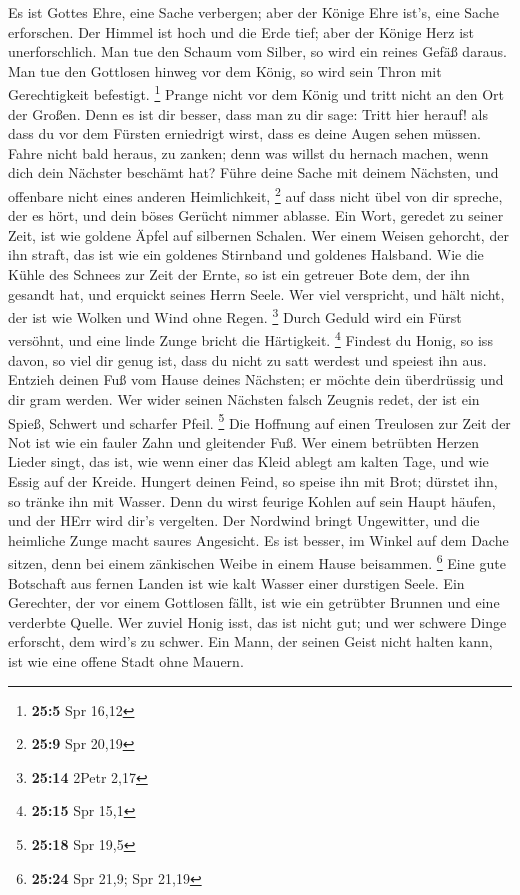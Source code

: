  Es ist Gottes Ehre, eine Sache verbergen; aber der Könige
Ehre ist's, eine Sache erforschen.  Der Himmel ist hoch
und die Erde tief; aber der Könige Herz ist unerforschlich.
 Man tue den Schaum vom Silber, so wird ein reines Gefäß
daraus.  Man tue den Gottlosen hinweg vor dem König, so
wird sein Thron mit Gerechtigkeit befestigt. \footnote{\textbf{25:5} Spr
  16,12}  Prange nicht vor dem König und tritt nicht an
den Ort der Großen.  Denn es ist dir besser, dass man zu
dir sage: Tritt hier herauf! als dass du vor dem Fürsten erniedrigt
wirst, dass es deine Augen sehen müssen.  Fahre nicht bald
heraus, zu zanken; denn was willst du hernach machen, wenn dich dein
Nächster beschämt hat?  Führe deine Sache mit deinem
Nächsten, und offenbare nicht eines anderen Heimlichkeit, \footnote{\textbf{25:9}
  Spr 20,19}  auf dass nicht übel von dir spreche, der es
hört, und dein böses Gerücht nimmer ablasse.  Ein Wort,
geredet zu seiner Zeit, ist wie goldene Äpfel auf silbernen Schalen.
 Wer einem Weisen gehorcht, der ihn straft, das ist wie
ein goldenes Stirnband und goldenes Halsband.  Wie die
Kühle des Schnees zur Zeit der Ernte, so ist ein getreuer Bote dem, der
ihn gesandt hat, und erquickt seines Herrn Seele.  Wer
viel verspricht, und hält nicht, der ist wie Wolken und Wind ohne Regen.
\footnote{\textbf{25:14} 2Petr 2,17}  Durch Geduld wird
ein Fürst versöhnt, und eine linde Zunge bricht die Härtigkeit.
\footnote{\textbf{25:15} Spr 15,1}  Findest du Honig, so
iss davon, so viel dir genug ist, dass du nicht zu satt werdest und
speiest ihn aus.  Entzieh deinen Fuß vom Hause deines
Nächsten; er möchte dein überdrüssig und dir gram werden.
 Wer wider seinen Nächsten falsch Zeugnis redet, der ist
ein Spieß, Schwert und scharfer Pfeil. \footnote{\textbf{25:18} Spr 19,5}
 Die Hoffnung auf einen Treulosen zur Zeit der Not ist
wie ein fauler Zahn und gleitender Fuß.  Wer einem
betrübten Herzen Lieder singt, das ist, wie wenn einer das Kleid ablegt
am kalten Tage, und wie Essig auf der Kreide.  Hungert
deinen Feind, so speise ihn mit Brot; dürstet ihn, so tränke ihn mit
Wasser.  Denn du wirst feurige Kohlen auf sein Haupt
häufen, und der HErr wird dir's vergelten.  Der Nordwind
bringt Ungewitter, und die heimliche Zunge macht saures Angesicht.
 Es ist besser, im Winkel auf dem Dache sitzen, denn bei
einem zänkischen Weibe in einem Hause beisammen. \footnote{\textbf{25:24}
  Spr 21,9; Spr 21,19}  Eine gute Botschaft aus fernen
Landen ist wie kalt Wasser einer durstigen Seele.  Ein
Gerechter, der vor einem Gottlosen fällt, ist wie ein getrübter Brunnen
und eine verderbte Quelle.  Wer zuviel Honig isst, das
ist nicht gut; und wer schwere Dinge erforscht, dem wird's zu schwer.
 Ein Mann, der seinen Geist nicht halten kann, ist wie
eine offene Stadt ohne Mauern.

